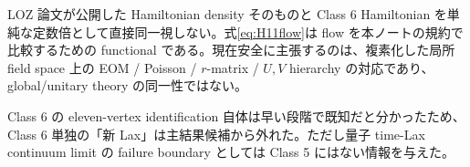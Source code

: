 \begin{cautionnote}
LOZ 論文が公開した Hamiltonian density そのものと Class 6 Hamiltonian を単純な定数倍として直接同一視しない。式\eqref{eq:H11flow}は flow を本ノートの規約で比較するための functional である。現在安全に主張するのは、複素化した局所 field space 上の EOM / Poisson / $r$-matrix / $U,V$ hierarchy の対応であり、global/unitary theory の同一性ではない。
\end{cautionnote}

\begin{historymemo}
Class 6 の eleven-vertex identification 自体は早い段階で既知だと分かったため、Class 6 単独の「新 Lax」は主結果候補から外れた。ただし量子 time-Lax continuum limit の failure boundary としては Class 5 にはない情報を与えた。
\end{historymemo}


